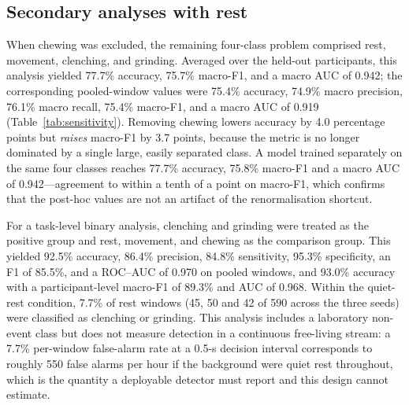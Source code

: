 \documentclass[pdflatex,sn-nature,iicol]{sn-jnl}
\begin{document}
\subsection{Secondary analyses with rest}

When chewing was excluded, the remaining four-class problem comprised rest, movement, clenching, and grinding. Averaged over the held-out participants, this analysis yielded 77.7\% accuracy, 75.7\% macro-F1, and a macro AUC of 0.942; the corresponding pooled-window values were 75.4\% accuracy, 74.9\% macro precision, 76.1\% macro recall, 75.4\% macro-F1, and a macro AUC of 0.919 (Table~\ref{tab:sensitivity}). Removing chewing lowers accuracy by 4.0 percentage points but \emph{raises} macro-F1 by 3.7 points, because the metric is no longer dominated by a single large, easily separated class. A model trained separately on the same four classes reaches 77.7\% accuracy, 75.8\% macro-F1 and a macro AUC of 0.942---agreement to within a tenth of a point on macro-F1, which confirms that the post-hoc values are not an artifact of the renormalisation shortcut.

For a task-level binary analysis, clenching and grinding were treated as the positive group and rest, movement, and chewing as the comparison group. This yielded 92.5\% accuracy, 86.4\% precision, 84.8\% sensitivity, 95.3\% specificity, an F1 of 85.5\%, and a ROC--AUC of 0.970 on pooled windows, and 93.0\% accuracy with a participant-level macro-F1 of 89.3\% and AUC of 0.968. Within the quiet-rest condition, 7.7\% of rest windows (45, 50 and 42 of 590 across the three seeds) were classified as clenching or grinding. This analysis includes a laboratory non-event class but does not measure detection in a continuous free-living stream: a 7.7\% per-window false-alarm rate at a 0.5-s decision interval corresponds to roughly 550 false alarms per hour if the background were quiet rest throughout, which is the quantity a deployable detector must report and this design cannot estimate.
\end{document}
